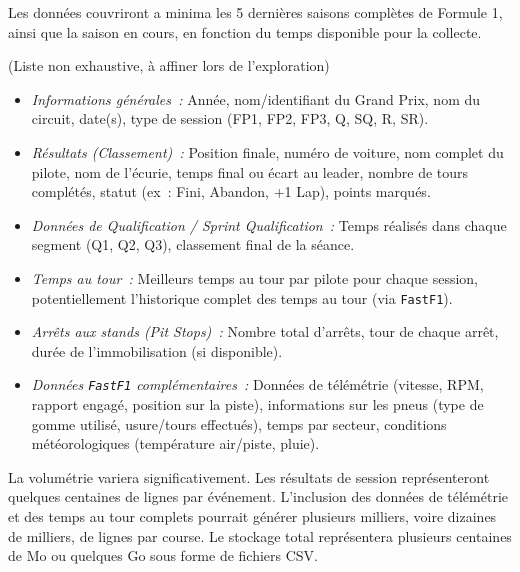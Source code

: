 \documentclass[11pt, a4paper]{article}
\begin{document}
\begin{description}[style=standard, itemsep=0.5em, labelwidth=!, leftmargin=1.5em, font=\normalfont]
    \item[Périmètre temporel~:] Les données couvriront a minima les 5 dernières saisons complètes de Formule 1, ainsi que la saison en cours, en fonction du temps disponible pour la collecte.
    \item[Attributs envisagés par session~:] (Liste non exhaustive, à affiner lors de l'exploration)
        \begin{itemize}[label=\textbullet, itemsep=0.2em, leftmargin=*]
            \item \textit{Informations générales~:} Année, nom/identifiant du Grand Prix, nom du circuit, date(s), type de session (FP1, FP2, FP3, Q, SQ, R, SR).
            \item \textit{Résultats (Classement)~:} Position finale, numéro de voiture, nom complet du pilote, nom de l'écurie, temps final ou écart au leader, nombre de tours complétés, statut (ex~: Fini, Abandon, +1 Lap), points marqués.
            \item \textit{Données de Qualification / Sprint Qualification~:} Temps réalisés dans chaque segment (Q1, Q2, Q3), classement final de la séance.
            \item \textit{Temps au tour~:} Meilleurs temps au tour par pilote pour chaque session, potentiellement l'historique complet des temps au tour (via \texttt{FastF1}).
            \item \textit{Arrêts aux stands (Pit Stops)~:} Nombre total d'arrêts, tour de chaque arrêt, durée de l'immobilisation (si disponible).
            \item \textit{Données \texttt{FastF1} complémentaires~:} Données de télémétrie (vitesse, RPM, rapport engagé, position sur la piste), informations sur les pneus (type de gomme utilisé, usure/tours effectués), temps par secteur, conditions météorologiques (température air/piste, pluie).
        \end{itemize}
    \item[Quantité estimée~:] La volumétrie variera significativement. Les résultats de session représenteront quelques centaines de lignes par événement. L'inclusion des données de télémétrie et des temps au tour complets pourrait générer plusieurs milliers, voire dizaines de milliers, de lignes par course. Le stockage total représentera plusieurs centaines de Mo ou quelques Go sous forme de fichiers CSV.
\end{description}
\end{document}
